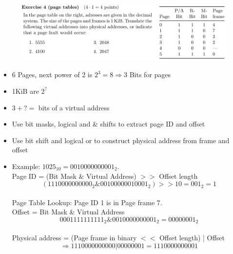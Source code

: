 \documentclass[10pt]{beamer}
\begin{document}
\begin{frame}{}
         \begin{figure}
          \includegraphics[keepaspectratio, width=\textwidth, height=\textheight]{img/103_ex5.png} \\
        \end{figure}
        \begin{itemize}
        \item 6 Pages, next power of 2 is $2^3 = 8 \Rightarrow 3$ Bits for pages
        \item 1KiB are $2^?$
        \item $3 + ? =$ bits of a virtual address 
        \item Use bit masks, logical and \& shifts to extract page ID and offset
        \item Use bit shift and logical or to construct physical address from frame and offset
        \framebreak
         \item Example: $1025_{10} = 0010000000001_2$. \\ \vspace{0.4cm}
        Page ID = (Bit Mask \& Virtual Address) $>>$ Offset length
            \[ (1110000000000_2 \& 00100000010001_2) >> 10 = 001_2 = 1 \] \\
        Page Table Lookup: Page ID 1 is in Page frame 7. \\ \vspace{0.4cm}
        Offset = Bit Mask \& Virtual Address
            \[ 0001111111111_2 \& 0010000000001_2  = 00000001_2 \] \\
        Physical address = (Page frame in binary $<<$ Offset length) | Offset \\
        \[\Rightarrow 111 0000000000 | 00000001 = 111 0000000001\]
        \end{itemize}
        \framebreak 
        

\end{frame}
\end{document}
